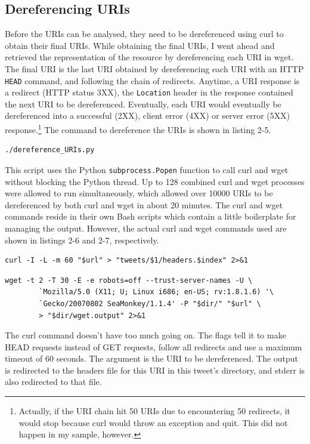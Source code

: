 \documentclass[a4paper,12pt]{article}
\begin{document}
\subsection{Dereferencing URIs}
Before the URIs can be analysed, they need to be dereferenced using curl to obtain their final URIs. While
obtaining
the final URIs, I went ahead and retrieved the representation of the resource by dereferencing each URI in
wget. The final URI is the last URI obtained by dereferencing each URI with an HTTP \texttt{HEAD} command,
and following the chain of redirects. Anytime, a URI response is a redirect (HTTP status 3XX), the \texttt{Location} header
in the response contained the next URI to be dereferenced.\cite{rfc2616} Eventually, each URI would eventually be
dereferenced into a successful (2XX), client error (4XX) or server error (5XX) response.\footnote{Actually,
if the URI chain hit 50 URIs due to encountering 50 redirects, it would stop because curl would throw an
exception and quit. This did not happen in my sample, however.} The command to dereference the URIs is shown
in listing 2-5.
\begin{lstlisting}[basicstyle=\ttfamily,caption={Dereferencing URIs}]
    ./dereference_URIs.py
\end{lstlisting}
This script uses the Python \texttt{subprocess.Popen} function to call curl and wget without blocking the
Python thread. Up to 128 combined curl and wget processes were allowed to run simultaneously, which
allowed over 10000 URIs to be dereferenced by both curl and wget in about 20 minutes. The curl and wget
commands reside in their own Bash scripts which contain a little boilerplate for managing the output.
However, the actual curl and wget commands used are shown in listings 2-6 and 2-7, respectively.
\begin{lstlisting}[basicstyle=\ttfamily,caption={Curl Command}]
    curl -I -L -m 60 "$url" > "tweets/$1/headers.$index" 2>&1
\end{lstlisting}
\begin{lstlisting}[basicstyle=\ttfamily,caption={Wget Command}]
    wget -t 2 -T 30 -E -e robots=off --trust-server-names -U \
        `Mozilla/5.0 (X11; U; Linux i686; en-US; rv:1.8.1.6) '\
        `Gecko/20070802 SeaMonkey/1.1.4' -P "$dir/" "$url" \
        > "$dir/wget.output" 2>&1
\end{lstlisting}
The curl command doesn't have too much going on. The flags tell it to make HEAD requests instead of GET
requests, follow all redirects and use a maximum timeout of 60 seconds. The argument is the URI to be
dereferenced. The output is redirected to the headers file for this URI in this tweet's directory,
and stderr is also redirected to that file.
\end{document}
